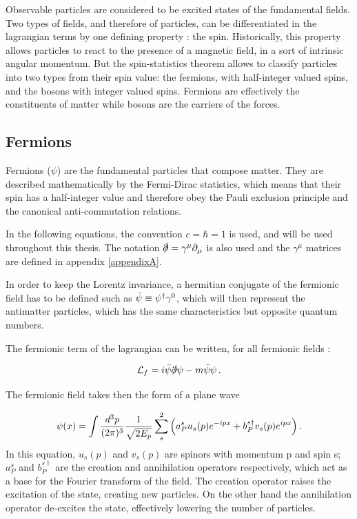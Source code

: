 Observable particles are considered to be excited states of the fundamental fields. Two types of fields, and therefore of particles, can be differentiated in the lagrangian terms by one defining property : the spin. Historically, this property allows particles to react to the presence of a magnetic field, in a sort of intrinsic angular momentum. But the spin-statistics theorem allows to classify particles into two types from their spin value: the fermions, with half-integer valued spins, and the bosons with integer valued spins. Fermions are effectively the constituents of matter while bosons are the carriers of the forces.

\subsection{Fermions}

Fermions ($\psi$) are the fundamental particles that compose matter. They are described mathematically by the Fermi-Dirac statistics, which means that their spin has a half-integer value and therefore obey the Pauli exclusion principle and the canonical anti-commutation relations.

In the following equations, the convention $c = \hbar = 1$ is used, and will be used throughout this thesis. The notation $\slashed{\partial} = \gamma^{\mu}\partial_{\mu}$ is also used and the $\gamma^{\mu}$ matrices are defined in appendix \ref{appendixA}. \newline

In order to keep the Lorentz invariance, a hermitian conjugate of the fermionic field has to be defined such as $\Bar{\psi} \equiv \psi^{\dagger}\gamma^0$, which will then represent the antimatter particles, which has the same characteristics but opposite quantum numbers.\newline

The fermionic term of the lagrangian can be written, for all fermionic fields :

\begin{equation}
    \Lagr_f = i\Bar{\psi}\slashed{\partial}\psi - m\Bar{\psi}\psi \mend
    \label{eq:free_fermion}
\end{equation}

The fermionic field takes then the form of a plane wave 

\begin{equation}
    \psi(x) = \int \frac{d^3 p}{(2\pi)^3} \frac{1}{\sqrt{2E_p}} \sum^{2}_{s} \Big( a^{s}_{P} u_s (p)e^{-ipx} + b^{s\dagger}_P v_s (p)e^{ipx} \Big) \mend
\end{equation}
In this equation, $u_s (p)$ and $v_s (p)$ are spinors with momentum p and spin s; $a^{s}_P$ and $b^{s\dagger}_P$ are the creation and annihilation operators respectively, which act as a base for the Fourier transform of the field. The creation operator raises the excitation of the state, creating new particles. On the other hand the annihilation operator de-excites the state, effectively lowering the number of particles.

